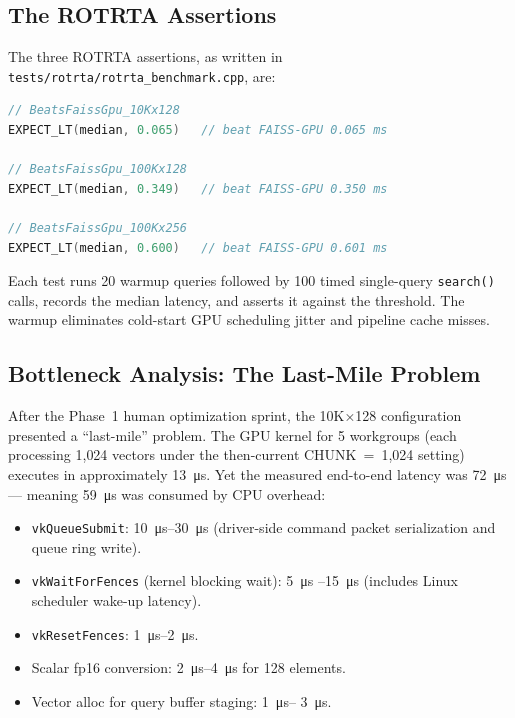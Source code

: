 \documentclass[conference]{IEEEtran}
\begin{document}
\subsection{The ROTRTA Assertions}

The three ROTRTA assertions, as written in
\texttt{tests/rotrta/rotrta\_benchmark.cpp}, are:

\begin{lstlisting}[language=C++,caption={ROTRTA assertions (immutable)}]
// BeatsFaissGpu_10Kx128
EXPECT_LT(median, 0.065)   // beat FAISS-GPU 0.065 ms

// BeatsFaissGpu_100Kx128
EXPECT_LT(median, 0.349)   // beat FAISS-GPU 0.350 ms

// BeatsFaissGpu_100Kx256
EXPECT_LT(median, 0.600)   // beat FAISS-GPU 0.601 ms
\end{lstlisting}

Each test runs 20 warmup queries followed by 100 timed single-query
\texttt{search()} calls, records the median latency, and asserts it against
the threshold.  The warmup eliminates cold-start GPU scheduling jitter and
pipeline cache misses.

\subsection{Bottleneck Analysis: The Last-Mile Problem}

After the Phase~1 human optimization sprint, the 10K×128 configuration
presented a ``last-mile'' problem.  The GPU kernel for 5 workgroups (each
processing 1{,}024 vectors under the then-current CHUNK~=~1{,}024 setting)
executes in approximately \SI{13}{\micro\second}.  Yet the measured
end-to-end latency was \SI{72}{\micro\second} --- meaning \SI{59}{\micro\second}
was consumed by CPU overhead:

\begin{itemize}
  \item \texttt{vkQueueSubmit}: \SI{10}{\micro\second}--\SI{30}{\micro\second}
        (driver-side command packet serialization and queue ring write).
  \item \texttt{vkWaitForFences} (kernel blocking wait): \SI{5}{\micro\second}
        --\SI{15}{\micro\second} (includes Linux scheduler wake-up latency).
  \item \texttt{vkResetFences}: \SI{1}{\micro\second}--\SI{2}{\micro\second}.
  \item Scalar fp16 conversion: \SI{2}{\micro\second}--\SI{4}{\micro\second}
        for 128 elements.
  \item Vector alloc for query buffer staging: \SI{1}{\micro\second}--
        \SI{3}{\micro\second}.
\end{itemize}
\end{document}

